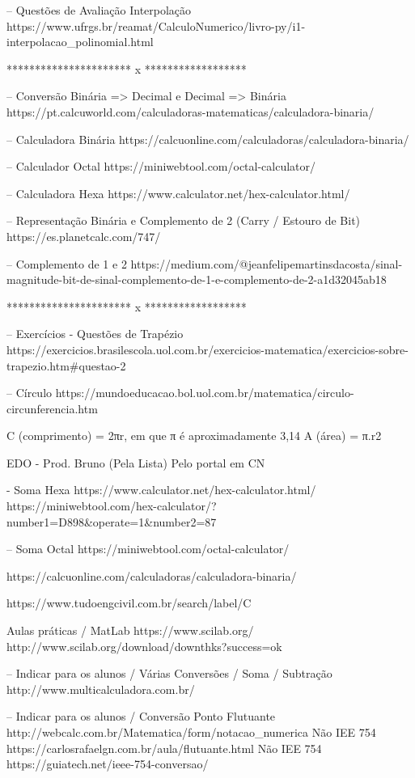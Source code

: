 -- Questões de Avaliação Interpolação
https://www.ufrgs.br/reamat/CalculoNumerico/livro-py/i1-interpolacao_polinomial.html

********************** x ******************

-- Conversão Binária => Decimal e Decimal => Binária
https://pt.calcuworld.com/calculadoras-matematicas/calculadora-binaria/

-- Calculadora Binária
https://calcuonline.com/calculadoras/calculadora-binaria/


-- Calculador Octal
https://miniwebtool.com/octal-calculator/


-- Calculadora Hexa
https://www.calculator.net/hex-calculator.html/


-- Representação Binária e Complemento de 2 (Carry / Estouro de Bit)
https://es.planetcalc.com/747/

-- Complemento de 1 e 2
https://medium.com/@jeanfelipemartinsdacosta/sinal-magnitude-bit-de-sinal-complemento-de-1-e-complemento-de-2-a1d32045ab18

********************** x ******************

-- Exercícios - Questões de Trapézio
https://exercicios.brasilescola.uol.com.br/exercicios-matematica/exercicios-sobre-trapezio.htm#questao-2

-- Círculo
https://mundoeducacao.bol.uol.com.br/matematica/circulo-circunferencia.htm

C (comprimento) = 2πr, em que π é aproximadamente 3,14
A (área) = π.r2

EDO - Prod. Bruno (Pela Lista) Pelo portal em CN

- Soma Hexa
https://www.calculator.net/hex-calculator.html/
https://miniwebtool.com/hex-calculator/?number1=D898&operate=1&number2=87

-- Soma Octal
https://miniwebtool.com/octal-calculator/

https://calcuonline.com/calculadoras/calculadora-binaria/

https://www.tudoengcivil.com.br/search/label/C%

Aulas práticas / MatLab
https://www.scilab.org/
http://www.scilab.org/download/downthks?success=ok

-- Indicar para os alunos / Várias Conversões / Soma / Subtração
http://www.multicalculadora.com.br/

-- Indicar para os alunos / Conversão Ponto Flutuante
http://webcalc.com.br/Matematica/form/notacao_numerica
Não IEE 754 https://carlosrafaelgn.com.br/aula/flutuante.html
Não IEE 754 https://guiatech.net/ieee-754-conversao/

